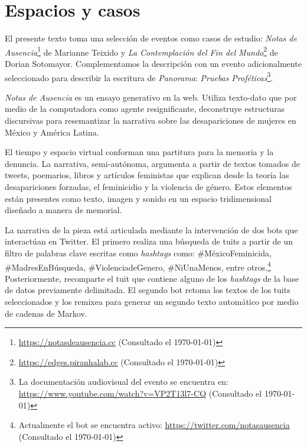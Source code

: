 
\section*{Espacios y casos} %

El presente texto toma una selección de eventos como casos de estudio: \textit{Notas de Ausencia}\footnote{\url{https://notasdeausencia.cc} (Consultado el \today)} de Marianne Teixido y \textit{La Contemplación del Fin del Mundo}\footnote{\url{https://edges.piranhalab.cc} (Consultado el \today)} de Dorian Sotomayor. Complementamos la descripción con un evento adicionalmente seleccionado para describir la escritura de \textit{Panorama}: \textit{Pruebas Proféticas}\footnote{La documentación audiovisual del evento se encuentra en: \url{https://www.youtube.com/watch?v=VP2T13l7-CQ} (Consultado el \today)}. %



\textit{Notas de Ausencia} \citep{notasdeausencia} es un ensayo generativo en la web. Utiliza texto-dato que por medio de la computadora como agente resignificante, deconstruye estructuras discursivas para resemantizar la narrativa sobre las desapariciones de mujeres en México y América Latina.

El tiempo y espacio virtual conforman una partitura para la memoria y la denuncia. La narrativa, semi-autónoma, argumenta a partir de textos tomados de tweets, poemarios, libros y artículos feministas que explican desde la teoría las desapariciones forzadas, el feminicidio y la violencia de género. Estos elementos están presentes como texto, imagen y sonido en un espacio tridimensional diseñado a manera de memorial.

La narrativa de la pieza está articulada mediante la intervención de dos bots que interactúan en Twitter. El primero realiza una búsqueda de tuits a partir de un filtro de palabras clave escritas como \textit{hashtags} como: \#MéxicoFeminicida, \#MadresEnBúsqueda, \#ViolenciadeGenero, \#NiUnaMenos, entre otros.\footnote{Actualmente el bot se encuentra activo: \url{https://twitter.com/notasausencia} (Consultado el \today)} Posteriormente, recomparte el tuit que contiene alguno de los \textit{hashtags} de la base de datos previamente delimitada. El segundo bot retoma los textos de los tuits seleccionados y los remixea para generar un segundo texto automático por medio de cadenas de Markov. 

